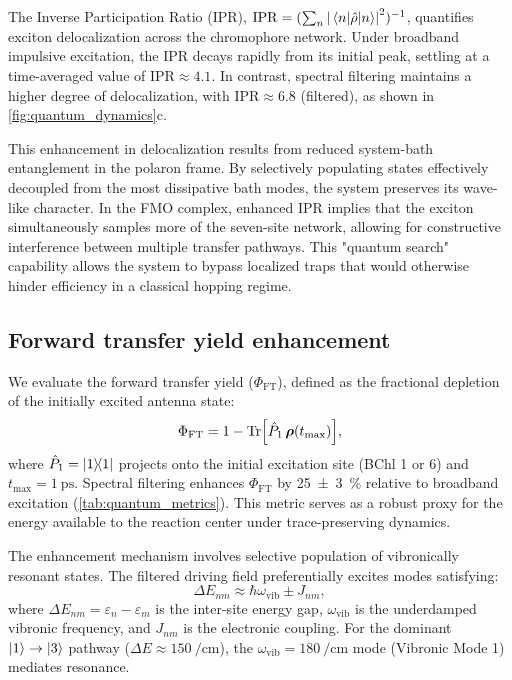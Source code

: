 \documentclass[journal=jpcl,manuscript=letter]{achemso}
\begin{document}
The Inverse Participation Ratio (IPR), $\mathrm{IPR} = (\sum_n \abs{\mel{n}{\hat{\rho}}{n}}^2)^{-1}$, quantifies exciton delocalization across the chromophore network. Under broadband impulsive excitation, the IPR decays rapidly from its initial peak, settling at a time-averaged value of $\mathrm{IPR} \approx 4.1$. In contrast, spectral filtering maintains a higher degree of delocalization, with $\mathrm{IPR} \approx 6.8$ (filtered), as shown in \cref{fig:quantum_dynamics}c. 

This enhancement in delocalization results from reduced system-bath entanglement in the polaron frame. By selectively populating states effectively decoupled from the most dissipative bath modes, the system preserves its wave-like character. In the FMO complex, enhanced IPR implies that the exciton simultaneously samples more of the seven-site network, allowing for constructive interference between multiple transfer pathways. This "quantum search" capability allows the system to bypass localized traps that would otherwise hinder efficiency in a classical hopping regime.

\subsection*{Forward transfer yield enhancement}

We evaluate the forward transfer yield ($\Phi_{\mathrm{FT}}$), defined as the fractional depletion of the initially excited antenna state:
\begin{equation}
\Phi_{\mathrm{FT}} = 1 - \Tr[\hat{P}_{1}\,\vb*{\rho}(t_{\max})],
\label{eq:ETE}
\end{equation}
where $\hat{P}_{1} = \dyad{1}$ projects onto the initial excitation site (BChl 1 or 6) and $t_{\max} = \SI{1}{\pico\second}$. Spectral filtering enhances $\Phi_{\mathrm{FT}}$ by \SI{25(3)}{\percent} relative to broadband excitation (\cref{tab:quantum_metrics}). This metric serves as a robust proxy for the energy available to the reaction center under trace-preserving dynamics.

The enhancement mechanism involves selective population of vibronically resonant states. The filtered driving field preferentially excites modes satisfying:
\begin{equation}
\Delta E_{nm} \approx \hbar\omega_{\mathrm{vib}} \pm J_{nm},
\label{eq:resonance_condition}
\end{equation}
where $\Delta E_{nm} = \varepsilon_n - \varepsilon_m$ is the inter-site energy gap, $\omega_{\mathrm{vib}}$ is the underdamped vibronic frequency, and $J_{nm}$ is the electronic coupling. For the dominant $\ket{1} \to \ket{3}$ pathway ($\Delta E \approx \SI{150}{\per\centi\meter}$), the $\omega_{\mathrm{vib}} = \SI{180}{\per\centi\meter}$ mode (Vibronic Mode 1) mediates resonance.\cite{Chin2013,Fleming2015,Scholes2015}
\end{document}
